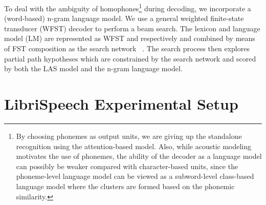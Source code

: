 \documentclass[a4paper]{article}
\begin{document}
To deal with the ambiguity of homophones\footnote{By choosing phonemes as output units,
we are giving up the standalone recognition using the attention-based model. Also, while 
acoustic modeling motivates the use of phonemes, the ability
of the decoder as a language model can possibly be weaker compared with character-based units,
since the phoneme-level language model can be viewed as a subword-level class-based language model \cite{Brown92}
where the clusters are formed based on the phonemic similarity.}
during decoding, we incorporate a
(word-based) n-gram language model. We use a general weighted finite-state
transducer (WFST) decoder to perform a beam search. The lexicon and language
model (LM) are represented as WFST  and  respectively and combined by means of
FST composition as the search network ~\cite{mohri2008}. The search
process then explores partial path hypotheses which are constrained by the
search network and scored by both the LAS model and the n-gram language model.
\vspace{-6mm}
\section{LibriSpeech Experimental Setup}
\end{document}
